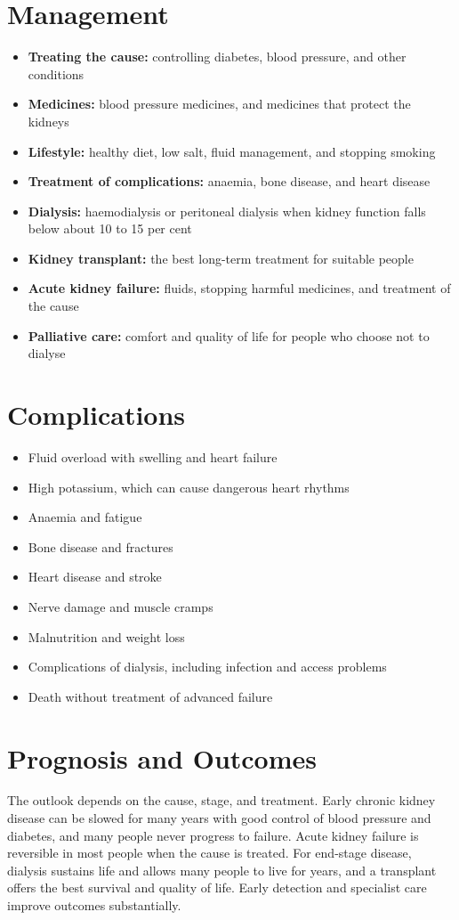 \section*{Management}
\begin{itemize}
    \item \textbf{Treating the cause:} controlling diabetes, blood pressure, and other conditions
    \item \textbf{Medicines:} blood pressure medicines, and medicines that protect the kidneys
    \item \textbf{Lifestyle:} healthy diet, low salt, fluid management, and stopping smoking
    \item \textbf{Treatment of complications:} anaemia, bone disease, and heart disease
    \item \textbf{Dialysis:} haemodialysis or peritoneal dialysis when kidney function falls below about 10 to 15 per cent
    \item \textbf{Kidney transplant:} the best long-term treatment for suitable people
    \item \textbf{Acute kidney failure:} fluids, stopping harmful medicines, and treatment of the cause
    \item \textbf{Palliative care:} comfort and quality of life for people who choose not to dialyse
\end{itemize}

\section*{Complications}
\begin{itemize}
    \item Fluid overload with swelling and heart failure
    \item High potassium, which can cause dangerous heart rhythms
    \item Anaemia and fatigue
    \item Bone disease and fractures
    \item Heart disease and stroke
    \item Nerve damage and muscle cramps
    \item Malnutrition and weight loss
    \item Complications of dialysis, including infection and access problems
    \item Death without treatment of advanced failure
\end{itemize}

\section*{Prognosis and Outcomes}
The outlook depends on the cause, stage, and treatment. Early chronic kidney disease can be slowed for many years with good control of blood pressure and diabetes, and many people never progress to failure. Acute kidney failure is reversible in most people when the cause is treated. For end-stage disease, dialysis sustains life and allows many people to live for years, and a transplant offers the best survival and quality of life. Early detection and specialist care improve outcomes substantially.

